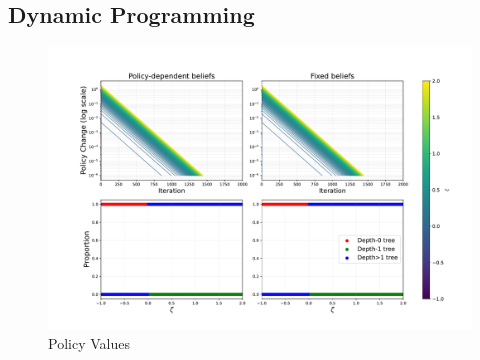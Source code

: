 \subsection{Dynamic Programming}
\begin{figure}[htbp]
    \centering
    \includegraphics[width=1\textwidth]{images/images_part1/qiteration}
    \caption{Policy Values}\label{fig:dp}
\end{figure}

